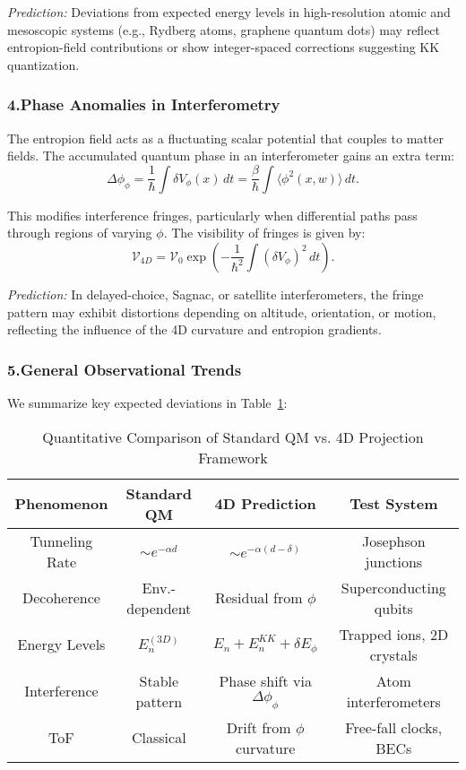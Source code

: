 \documentclass[12pt]{article}
\begin{document}
\emph{Prediction:} Deviations from expected energy levels in high-resolution atomic and mesoscopic systems (e.g., Rydberg atoms, graphene quantum dots) may reflect entropion-field contributions or show integer-spaced corrections suggesting KK quantization.

\subsubsection*{4.Phase Anomalies in Interferometry}

The entropion field acts as a fluctuating scalar potential that couples to matter fields. The accumulated quantum phase in an interferometer gains an extra term:
\begin{equation}
\Delta \phi_{\phi} = \frac{1}{\hbar} \int \delta V_\phi(x) \, dt = \frac{\beta}{\hbar} \int \langle \phi^2(x, w) \rangle \, dt.
\label{eq:interferometric_phase}
\end{equation}

This modifies interference fringes, particularly when differential paths pass through regions of varying \(\phi\). The visibility of fringes is given by:
\begin{equation}
\mathcal{V}_{4D} = \mathcal{V}_0 \exp\left( -\frac{1}{\hbar^2} \int (\delta V_\phi)^2 \, dt \right).
\end{equation}

\emph{Prediction:} In delayed-choice, Sagnac, or satellite interferometers, the fringe pattern may exhibit distortions depending on altitude, orientation, or motion, reflecting the influence of the 4D curvature and entropion gradients.

\subsubsection*{5.General Observational Trends}

We summarize key expected deviations in Table~\ref{tab:deviation_comparison}:

\begin{table}[H]
\centering
\caption{Quantitative Comparison of Standard QM vs. 4D Projection Framework}
\label{tab:deviation_comparison}
\begin{tabular}{|c|c|c|c|}
\hline
\textbf{Phenomenon} & \textbf{Standard QM} & \textbf{4D Prediction} & \textbf{Test System} \\
\hline
Tunneling Rate & \(\sim e^{-\alpha d}\) & \(\sim e^{-\alpha (d - \delta)}\) & Josephson junctions \\
\hline
Decoherence & Env.-dependent & Residual from \(\phi\) & Superconducting qubits \\
\hline
Energy Levels & \(E_n^{(3D)}\) & \(E_n + E_n^{KK} + \delta E_\phi\) & Trapped ions, 2D crystals \\
\hline
Interference & Stable pattern & Phase shift via \(\Delta \phi_\phi\) & Atom interferometers \\
\hline
ToF & Classical & Drift from \(\phi\) curvature & Free-fall clocks, BECs \\
\hline
\end{tabular}
\end{table}
\end{document}
